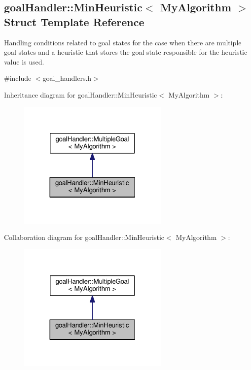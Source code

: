 \hypertarget{structgoalHandler_1_1MinHeuristic}{}\subsection{goal\+Handler\+:\+:Min\+Heuristic$<$ My\+Algorithm $>$ Struct Template Reference}
\label{structgoalHandler_1_1MinHeuristic}


Handling conditions related to goal states for the case when there are multiple goal states and a heuristic that stores the goal state responsible for the heuristic value is used.  




{\ttfamily \#include $<$goal\+\_\+handlers.\+h$>$}



Inheritance diagram for goal\+Handler\+:\+:Min\+Heuristic$<$ My\+Algorithm $>$\+:\nopagebreak
\begin{figure}[H]
\begin{center}
\leavevmode
\includegraphics[width=209pt]{structgoalHandler_1_1MinHeuristic__inherit__graph}
\end{center}
\end{figure}


Collaboration diagram for goal\+Handler\+:\+:Min\+Heuristic$<$ My\+Algorithm $>$\+:\nopagebreak
\begin{figure}[H]
\begin{center}
\leavevmode
\includegraphics[width=209pt]{structgoalHandler_1_1MinHeuristic__coll__graph}
\end{center}
\end{figure}
